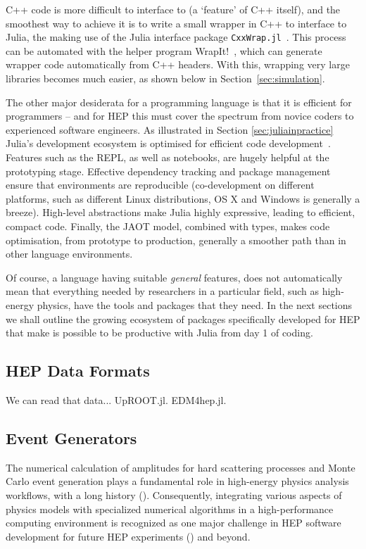 \documentclass{webofc}
\begin{document}
C++ code is more difficult to interface to (a `feature' of C++ itself), and the
smoothest way to achieve it is to write a small wrapper in C++ to interface to
Julia, the making use of the Julia interface package
\texttt{CxxWrap.jl}~\cite{CxxWrap.jl}. This process can be automated with the
helper program WrapIt!~\cite{wrapit-github}, which can generate wrapper code
automatically from C++ headers. With this, wrapping very large libraries becomes
much easier, as shown below in Section~\ref{sec:simulation}.

The other major desiderata for a programming language is that it is efficient
for programmers -- and for HEP this must cover the spectrum from novice coders
to experienced software engineers. As illustrated in Section
\ref{sec:juliainpractice} Julia's development ecosystem is optimised for
efficient code development~\cite{perkel-julia-science}. Features such as the
REPL, as well as notebooks, are hugely helpful at the prototyping stage.
Effective dependency tracking and package management ensure that environments
are reproducible (co-development on different platforms, such as different Linux
distributions, OS X and Windows is generally a breeze). High-level abstractions
make Julia highly expressive, leading to efficient, compact code. Finally, the
JAOT model, combined with types, makes code optimisation, from prototype to
production, generally a smoother path than in other language environments.

Of course, a language having suitable \emph{general} features, does not
automatically mean that everything needed by researchers in a particular field,
such as high-energy physics, have the tools and packages that they need. In the
next sections we shall outline the growing ecosystem of packages specifically
developed for HEP that make is possible to be productive with Julia from day 1
of coding. 

\subsection{HEP Data Formats}

We can read that data... UpROOT.jl. EDM4hep.jl.

\subsection{Event Generators}

The numerical calculation of amplitudes for hard scattering processes and Monte
Carlo event generation plays a fundamental role in high-energy physics analysis
workflows, with a long history (\cite{campbell2024event}). Consequently,
integrating various aspects of physics models with specialized numerical
algorithms in a high-performance computing environment is recognized as one
major challenge in HEP software development for future HEP experiments
(\cite{HEPSoftwareFoundation:2017ggl, HSFPhysicsEventGeneratorWG:2020gxw,
HSFPhysicsEventGeneratorWG:2021xti}) and beyond.
\end{document}
